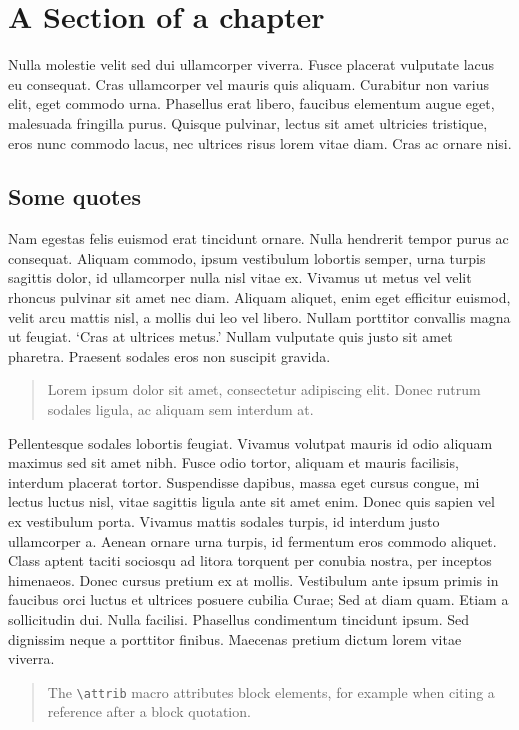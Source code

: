 \documentclass[sotoncolour]{uosarticle}     %
\begin{document}
\section{A Section of a chapter}
Nulla molestie velit sed dui ullamcorper viverra. Fusce placerat vulputate lacus eu consequat. Cras ullamcorper vel mauris quis aliquam. Curabitur non varius elit, eget commodo urna. Phasellus erat libero, faucibus elementum augue eget, malesuada fringilla purus. Quisque pulvinar, lectus sit amet ultricies tristique, eros nunc commodo lacus, nec ultrices risus lorem vitae diam. Cras ac ornare nisi.

\subsection{Some quotes}

Nam egestas felis euismod erat tincidunt ornare. Nulla hendrerit tempor purus ac consequat. Aliquam commodo, ipsum vestibulum lobortis semper, urna turpis sagittis dolor, id ullamcorper nulla nisl vitae ex. Vivamus ut metus vel velit rhoncus pulvinar sit amet nec diam. Aliquam aliquet, enim eget efficitur euismod, velit arcu mattis nisl, a mollis dui leo vel libero. Nullam porttitor convallis magna ut feugiat. `Cras at ultrices metus.' Nullam vulputate quis justo sit amet pharetra. Praesent sodales eros non suscipit gravida.
\begin{quote}
Lorem ipsum dolor sit amet, consectetur adipiscing elit. Donec rutrum sodales ligula, ac aliquam sem interdum at.
\end{quote}

Pellentesque sodales lobortis feugiat. Vivamus volutpat mauris id odio aliquam maximus sed sit amet nibh. Fusce odio tortor, aliquam et mauris facilisis, interdum placerat tortor. Suspendisse dapibus, massa eget cursus congue, mi lectus luctus nisl, vitae sagittis ligula ante sit amet enim. Donec quis sapien vel ex vestibulum porta. Vivamus mattis sodales turpis, id interdum justo ullamcorper a. Aenean ornare urna turpis, id fermentum eros commodo aliquet. Class aptent taciti sociosqu ad litora torquent per conubia nostra, per inceptos himenaeos. Donec cursus pretium ex at mollis. Vestibulum ante ipsum primis in faucibus orci luctus et ultrices posuere cubilia Curae; Sed at diam quam. Etiam a sollicitudin dui. Nulla facilisi. Phasellus condimentum tincidunt ipsum. Sed dignissim neque a porttitor finibus. Maecenas pretium dictum lorem vitae viverra.
\begin{quote}
The \verb|\attrib| macro attributes block elements, for example when citing
a reference after a block quotation.
\ifdefined\attrib{}\fi
\end{quote}
\end{document}
